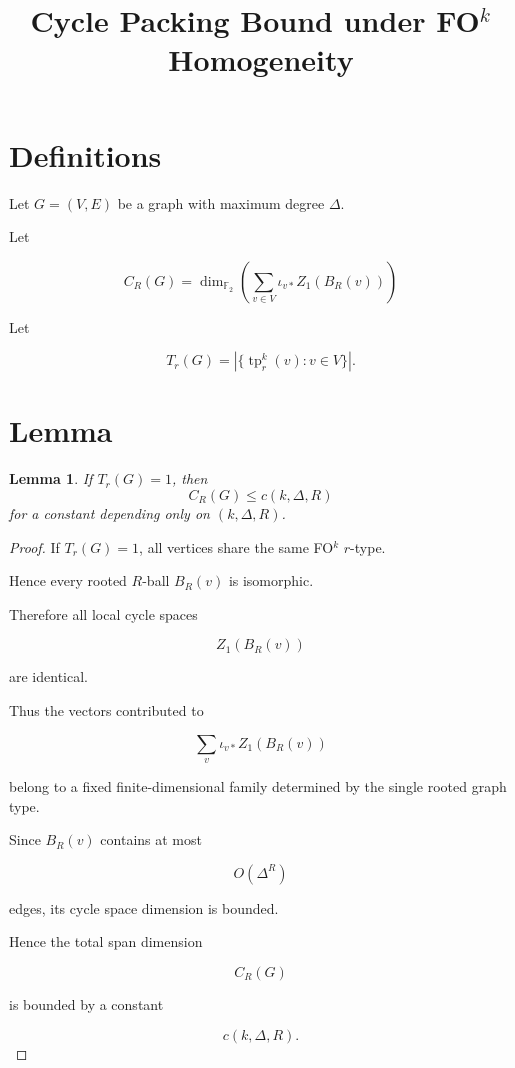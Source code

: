 \documentclass{article}
\newtheorem{lemma}{Lemma}
\begin{document}
\title{Cycle Packing Bound under FO$^k$ Homogeneity}
\date{}
\maketitle

\begin{center}
\end{center}


\section*{Definitions}

Let $G=(V,E)$ be a graph with maximum degree $\Delta$.

Let

\[
C_R(G)
=
\dim_{\mathbb F_2}
\left(
\sum_{v\in V}
\iota_{v*} Z_1(B_R(v))
\right)
\]

Let

\[
T_r(G)
=
\left|
\{
\operatorname{tp}^k_r(v): v\in V
\}
\right|.
\]

\section*{Lemma}

\begin{lemma}
If $T_r(G)=1$, then
\[
C_R(G)\le c(k,\Delta,R)
\]
for a constant depending only on $(k,\Delta,R)$.
\end{lemma}

\begin{proof}

If $T_r(G)=1$, all vertices share the same FO$^k$ $r$-type.

Hence every rooted $R$-ball $B_R(v)$ is isomorphic.

Therefore all local cycle spaces

\[
Z_1(B_R(v))
\]

are identical.

Thus the vectors contributed to

\[
\sum_v \iota_{v*} Z_1(B_R(v))
\]

belong to a fixed finite-dimensional family determined by the
single rooted graph type.

Since $B_R(v)$ contains at most

\[
O(\Delta^R)
\]

edges, its cycle space dimension is bounded.

Hence the total span dimension

\[
C_R(G)
\]

is bounded by a constant

\[
c(k,\Delta,R).
\]

\end{proof}
\end{document}
